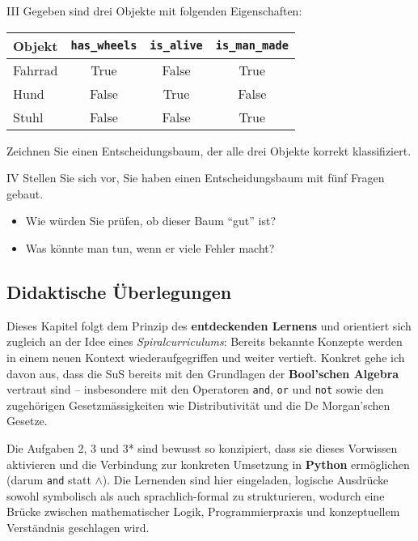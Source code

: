 \begin{aufgabe}{III}
Gegeben sind drei Objekte mit folgenden Eigenschaften:

\begin{center}
\begin{tabular}{|l|c|c|c|}
\hline
\textbf{Objekt} & \texttt{has\_wheels} & \texttt{is\_alive} & \texttt{is\_man\_made} \\
\hline
Fahrrad & True & False & True \\
Hund & False & True & False \\
Stuhl & False & False & True \\
\hline
\end{tabular}
\end{center}

Zeichnen Sie einen Entscheidungsbaum, der alle drei Objekte korrekt klassifiziert.
\end{aufgabe}

\begin{aufgabe}{IV}
Stellen Sie sich vor, Sie haben einen Entscheidungsbaum mit fünf Fragen gebaut.  
\begin{itemize}
  \item Wie würden Sie prüfen, ob dieser Baum ``gut'' ist?  
  \item Was könnte man tun, wenn er viele Fehler macht?  
\end{itemize}
\end{aufgabe}

\subsection*{Didaktische Überlegungen}

Dieses Kapitel folgt dem Prinzip des \textbf{entdeckenden Lernens} und orientiert sich zugleich an der Idee eines \emph{Spiralcurriculums}: Bereits bekannte Konzepte werden in einem neuen Kontext wiederaufgegriffen und weiter vertieft. Konkret gehe ich davon aus, dass die SuS bereits mit den Grundlagen der \textbf{Bool’schen Algebra} vertraut sind – insbesondere mit den Operatoren \texttt{and}, \texttt{or} und \texttt{not} sowie den zugehörigen Gesetzmässigkeiten wie Distributivität und die De Morgan'schen Gesetze.

Die Aufgaben 2, 3 und 3* sind bewusst so konzipiert, dass sie dieses Vorwissen aktivieren und die Verbindung zur konkreten Umsetzung in \textbf{Python} ermöglichen (darum \texttt{and} statt $\land$). Die Lernenden sind hier eingeladen, logische Ausdrücke sowohl symbolisch als auch sprachlich-formal zu strukturieren, wodurch eine Brücke zwischen mathematischer Logik, Programmierpraxis und konzeptuellem Verständnis geschlagen wird.

